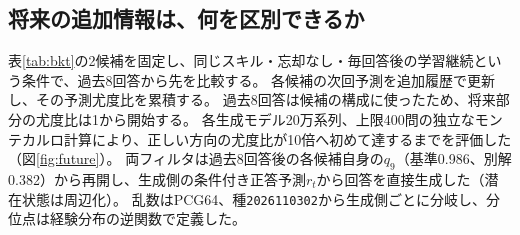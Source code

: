 \documentclass[10pt,a4paper]{article}
\begin{document}
\subsection{将来の追加情報は、何を区別できるか}
表\ref{tab:bkt}の2候補を固定し、同じスキル・忘却なし・毎回答後の学習継続という条件で、過去8回答から先を比較する。
各候補の次回予測を追加履歴で更新し、その予測尤度比を累積する。
過去8回答は候補の構成に使ったため、将来部分の尤度比は1から開始する。
各生成モデル20万系列、上限400問の独立なモンテカルロ計算により、正しい方向の尤度比が10倍へ初めて達するまでを評価した（図\ref{fig:future}）。
両フィルタは過去8回答後の各候補自身の$q_9$（基準0.986、別解0.382）から再開し、生成側の条件付き正答予測$r_t$から回答を直接生成した（潜在状態は周辺化）。
乱数はPCG64、種\texttt{2026110302}から生成側ごとに分岐し、分位点は経験分布の逆関数で定義した。
\end{document}

